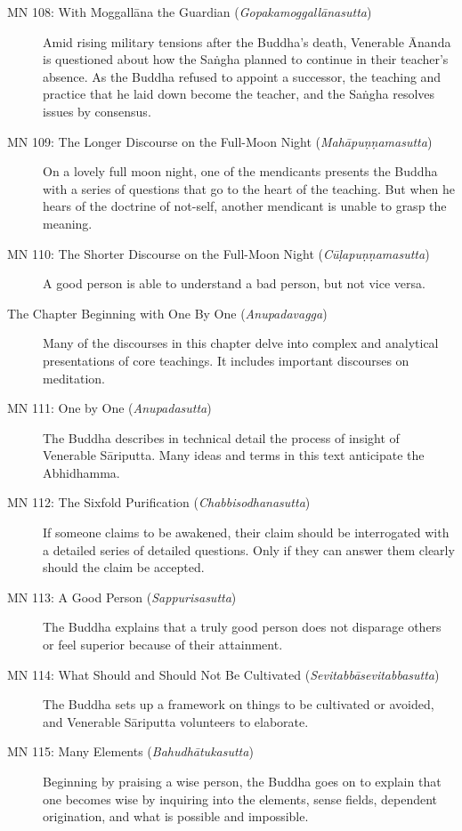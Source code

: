 \documentclass[12pt,openany]{book}%
\begin{document}
\begin{description}
\item[MN 108: With \textsanskrit{Moggallāna} the Guardian (\textit{\textsanskrit{Gopakamoggallānasutta}})] Amid rising military tensions after the Buddha’s death, Venerable Ānanda is questioned about how the \textsanskrit{Saṅgha} planned to continue in their teacher’s absence. As the Buddha refused to appoint a successor, the teaching and practice that he laid down become the teacher, and the \textsanskrit{Saṅgha} resolves issues by consensus.%
\item[MN 109: The Longer Discourse on the Full-Moon Night (\textit{\textsanskrit{Mahāpuṇṇamasutta}})] On a lovely full moon night, one of the mendicants presents the Buddha with a series of questions that go to the heart of the teaching. But when he hears of the doctrine of not-self, another mendicant is unable to grasp the meaning.%
\item[MN 110: The Shorter Discourse on the Full-Moon Night (\textit{\textsanskrit{Cūḷapuṇṇamasutta}})] A good person is able to understand a bad person, but not vice versa.%
\item[The Chapter Beginning with One By One (\textit{\textsanskrit{Anupadavagga}})] Many of the discourses in this chapter delve into complex and analytical presentations of core teachings. It includes important discourses on meditation.%
\item[MN 111: One by One (\textit{\textsanskrit{Anupadasutta}})] The Buddha describes in technical detail the process of insight of Venerable \textsanskrit{Sāriputta}. Many ideas and terms in this text anticipate the Abhidhamma.%
\item[MN 112: The Sixfold Purification (\textit{\textsanskrit{Chabbisodhanasutta}})] If someone claims to be awakened, their claim should be interrogated with a detailed series of detailed questions. Only if they can answer them clearly should the claim be accepted.%
\item[MN 113: A Good Person (\textit{\textsanskrit{Sappurisasutta}})] The Buddha explains that a truly good person does not disparage others or feel superior because of their attainment.%
\item[MN 114: What Should and Should Not Be Cultivated (\textit{\textsanskrit{Sevitabbāsevitabbasutta}})] The Buddha sets up a framework on things to be cultivated or avoided, and Venerable \textsanskrit{Sāriputta} volunteers to elaborate.%
\item[MN 115: Many Elements (\textit{\textsanskrit{Bahudhātukasutta}})] Beginning by praising a wise person, the Buddha goes on to explain that one becomes wise by inquiring into the elements, sense fields, dependent origination, and what is possible and impossible.%

\end{description}
\end{document}

